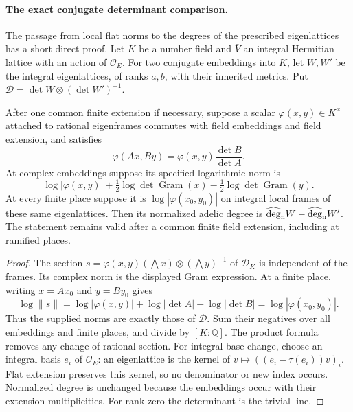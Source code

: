\paragraph{The exact conjugate determinant comparison.}
The passage from local flat norms to the degrees of the prescribed
eigenlattices has a short direct proof. Let $K$ be a number field and
$\bar V$ an integral Hermitian lattice with an action of $\mathcal O_E$.
For two conjugate embeddings into $K$, let $W,W'$ be the integral
eigenlattices, of ranks $a,b$, with their inherited metrics. Put
$\mathcal D=\det W\otimes(\det W')^{-1}$.

\begin{lemma}\label{geo-flat-determinant-bridge}
After one common finite extension if necessary, suppose a scalar
$\varphi(x,y)\in K^\times$ attached to rational eigenframes commutes
with field embeddings and field extension, and satisfies
\[
 \varphi(Ax,By)=\varphi(x,y)\frac{\det B}{\det A}.
\]
At complex embeddings suppose its specified logarithmic norm is
\[
 \log|\varphi(x,y)|+
 \tfrac12\log\det\operatorname{Gram}(x)-
 \tfrac12\log\det\operatorname{Gram}(y).
\]
At every finite place suppose it is $\log|\varphi(x_0,y_0)|$
on integral local frames of these same eigenlattices. Then its normalized
adelic degree is
$\widehat{\deg}_{\rm n}W-\widehat{\deg}_{\rm n}W'$.
The statement remains valid after a common finite field extension,
including at ramified places.
\end{lemma}
\begin{proof}
The section
$s=\varphi(x,y)(\bigwedge x)\otimes(\bigwedge y)^{-1}$ of
$\mathcal D_K$ is independent of the frames. Its complex norm is the
displayed Gram expression. At a finite place, writing $x=Ax_0$ and
$y=By_0$ gives
\[
 \log\|s\|=\log|\varphi(x,y)|+\log|\det A|-\log|\det B|
                         =\log|\varphi(x_0,y_0)|.
\]
Thus the supplied norms are exactly those of $\mathcal D$. Sum their
negatives over all embeddings and finite places, and divide by
$[K:\mathbb Q]$. The product formula removes any change of rational
section. For integral base change, choose an integral basis $e_i$ of
$\mathcal O_E$: an eigenlattice is the kernel of
$v\mapsto((e_i-\tau(e_i))v)_i$. Flat extension preserves this kernel,
so no denominator or new index occurs. Normalized degree is unchanged
because the embeddings occur with their extension multiplicities.
For rank zero the determinant is the trivial line.
\end{proof}

